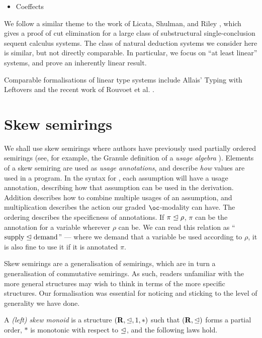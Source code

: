 \documentclass[submission,copyright,creativecommons]{eptcs}
\begin{document}
\begin{itemize}
  \item Coeffects \cite{BrunelGMZ14,GhicaS14,reed10distance,PetricekOM14}
\end{itemize}

We follow a similar theme to the work of Licata, Shulman, and Riley
\cite{LicataSR17}, which gives a proof of cut elimination for a large class of
substructural single-conclusion sequent calculus systems.
The class of natural deduction systems we consider here is similar, but not
directly comparable.
In particular, we focus on ``at least linear'' systems, and prove an inherently
linear result.

Comparable formalisations of linear type systems include Allais' Typing with
Leftovers \cite{allais:LIPIcs:2018:10049} and the recent work of Rouvoet et al.
\cite{RPKV20}.

\section{Skew semirings}\label{sec:algebra}

We shall use skew semirings where authors have previously used partially ordered
semirings (see, for example, the Granule definition of a \emph{usage algebra} \cite{Granule18}).
Elements of a skew semiring are used as \emph{usage annotations}, and describe
\emph{how} values are used in a program.
In the syntax for \name{}, each assumption will have a usage annotation,
describing how that assumption can be used in the derivation.
Addition describes how to combine multiple usages of an assumption, and
multiplication describes the action our graded $\oc$-modality can have.
The ordering describes the specificness of annotations.
If $\pi \trianglelefteq \rho$, $\pi$ can be the annotation for a variable wherever
$\rho$ can be.
We can read this relation as ``$\textrm{supply} \trianglelefteq \textrm{demand}$'' ---
where we demand that a variable be used according to $\rho$, it is also fine to
use it if it is annotated $\pi$.

Skew semirings are a generalisation of semirings, which are in turn a
generalisation of commutative semirings.
As such, readers unfamiliar with the more general structures may wish to think
in terms of the more specific structures.
Our formalisation was essential for noticing and sticking to the level of
generality we have done.

\begin{definition}
  A \emph{(left) skew monoid} is a structure $(\mathbf R, \trianglelefteq, 1, *)$ such
  that $(\mathbf R, \trianglelefteq)$ forms a partial order, $*$ is monotonic with
  respect to $\trianglelefteq$, and the following laws hold.
\end{definition}
\end{document}
